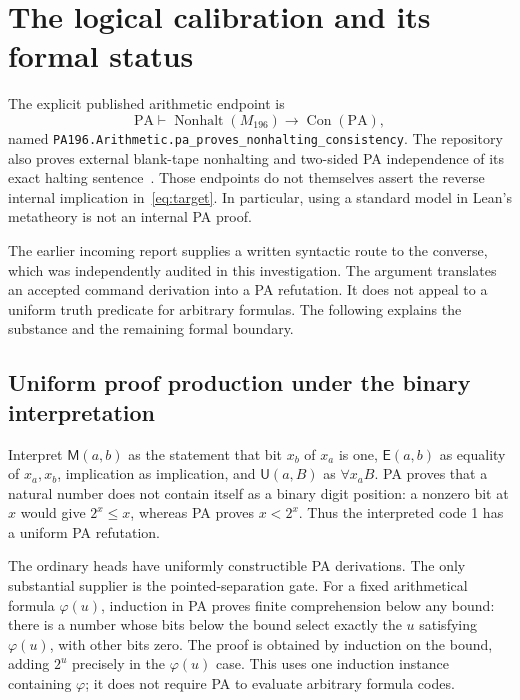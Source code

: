 \documentclass[11pt,letterpaper]{article}
\newcommand{\PA}{\mathrm{PA}}
\newcommand{\Con}{\operatorname{Con}}
\newcommand{\NH}{\operatorname{Nonhalt}}
\newcommand{\M}{\mathsf M}
\newcommand{\U}{\mathsf U}
\newcommand{\E}{\mathsf E}
\newcommand{\file}[1]{\texttt{\nolinkurl{#1}}}
\begin{document}
\section{The logical calibration and its formal status}
\label{sec:logic}

The explicit published arithmetic endpoint is
\begin{equation}\label{eq:upstream}
 \PA\vdash\NH(M_{196})\to\Con(\PA),
\end{equation}
named \file{PA196.Arithmetic.pa_proves_nonhalting_consistency}.
The repository also proves external blank-tape nonhalting and two-sided
PA independence of its exact halting sentence~\cite{status}.
Those endpoints do not themselves assert the reverse internal
implication in~\eqref{eq:target}. In particular, using a standard model
in Lean's metatheory is not an internal PA proof.

The earlier incoming report supplies a written syntactic route to the
converse, which was independently audited in this investigation. The
argument translates an accepted command derivation into a PA refutation.
It does not appeal to a uniform truth predicate for arbitrary formulas.
The following explains the substance and the remaining formal boundary.

\subsection{Uniform proof production under the binary interpretation}

Interpret $\M(a,b)$ as the statement that bit $x_b$ of $x_a$ is one,
$\E(a,b)$ as equality of $x_a,x_b$, implication as implication, and
$\U(a,B)$ as $\forall x_a B$. PA proves that a natural number does
not contain itself as a binary digit position: a nonzero bit at $x$ would
give $2^x\le x$, whereas PA proves $x<2^x$.
Thus the interpreted code 1 has a uniform PA refutation.

The ordinary heads have uniformly constructible PA derivations.
The only substantial supplier is the pointed-separation gate.
For a fixed arithmetical formula $\varphi(u)$, induction in PA proves
finite comprehension below any bound: there is a number whose bits below
the bound select exactly the $u$ satisfying $\varphi(u)$, with other
bits zero. The proof is obtained by induction on the bound, adding
$2^u$ precisely in the $\varphi(u)$ case. This uses one induction
instance containing $\varphi$; it does not require PA to evaluate
arbitrary formula codes.
\end{document}
